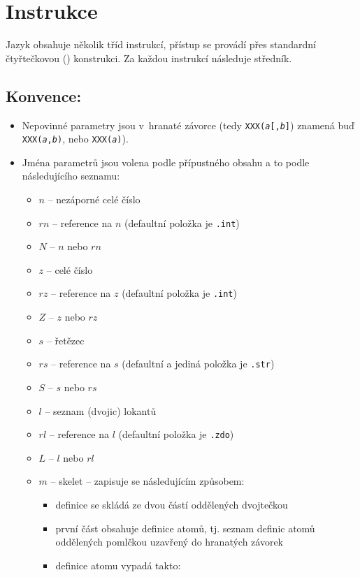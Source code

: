 \section{Instrukce}
Jazyk obsahuje několik tříd instrukcí, přístup se provádí přes standardní
čtyřtečkovou () konstrukci. Za každou instrukcí následuje
středník.

\subsection{Konvence:}
\begin{itemize}
	\item Nepovinné parametry jsou v~hranaté závorce (tedy
		  {\tt XXX(\textit{a}[,\textit{b}]}) znamená buď
		  {\tt XXX(\textit{a},\textit{b})}, nebo {\tt XXX(\textit{a})}).
	\item Jména parametrů jsou volena podle přípustného obsahu a to podle
		  následujícího seznamu:
		  \begin{itemize}
				\item $n$ -- nezáporné celé číslo
				\item $rn$ -- reference na $n$ (defaultní položka je {\tt .int})
				\item $N$ -- $n$ nebo $rn$
				\item $z$ -- celé číslo
				\item $rz$ -- reference na $z$ (defaultní položka je {\tt .int})
				\item $Z$ -- $z$ nebo $rz$
				\item $s$ -- řetězec
				\item $rs$ -- reference na $s$ (defaultní a jediná položka je
						  {\tt .str})
				\item $S$ -- $s$ nebo $rs$
				\item $l$ -- seznam (dvojic) lokantů
				\item $rl$ -- reference na $l$ (defaultní položka je {\tt .zdo})
				\item $L$ -- $l$ nebo $rl$
				\item $m$ -- skelet -- zapisuje se následujícím způsobem:
					\begin{itemize}
						\item definice se skládá ze dvou částí oddělených
							  dvojtečkou
						\item první část obsahuje definice atomů, tj. seznam
							  definic atomů oddělených pomlčkou uzavřený do
							  hranatých závorek
						\item definice atomu vypadá takto: \\

\end{itemize}
\end{itemize}
\end{itemize}
